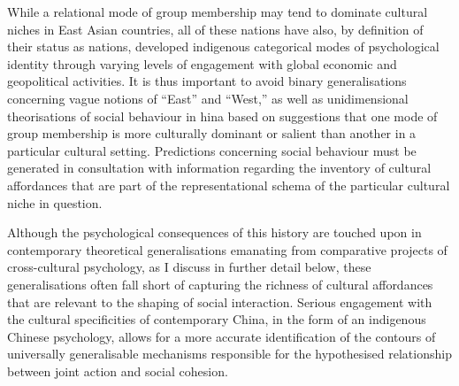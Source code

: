 {
While a relational mode of group membership may tend to dominate cultural niches in East Asian countries, all of these nations have also, by definition of their status as nations, developed indigenous categorical modes of psychological identity through varying levels of engagement with global economic and geopolitical activities. It is thus important to avoid binary generalisations concerning vague notions of ``East'' and ``West,'' as well as unidimensional theorisations of social behaviour in hina based on suggestions that one mode of group membership is more culturally dominant or salient than another in a particular cultural setting.  Predictions concerning social behaviour must be generated in consultation with information regarding the inventory of cultural affordances that are part of the representational schema of the particular cultural niche in question.



Although the psychological consequences of this history are touched upon in contemporary theoretical generalisations emanating from comparative projects of cross-cultural psychology, as I discuss in further detail below, these generalisations often fall short of capturing the richness of cultural affordances that are relevant to the shaping of social interaction.  Serious engagement with the cultural specificities of contemporary China, in the form of an indigenous Chinese psychology, allows for a more accurate identification of the contours of universally generalisable mechanisms responsible for the hypothesised relationship between joint action and social cohesion.



}
